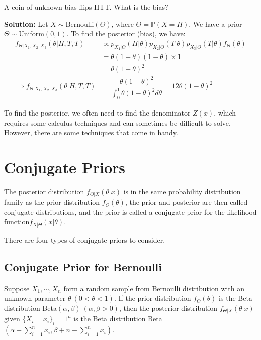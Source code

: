 \newpage
\begin{eg}
  A coin of unknown bias flips HTT. What is the bias?

  \textbf{Solution:} 
  Let \(X \sim \text{Bernoulli}(\Theta)\), where \(\Theta = \mathbb{P}(X = H)\). We have a prior \(\Theta \sim \text{Uniform}(0, 1)\). To find the posterior (bias), we have:
  \[
    \begin{aligned}
      f_{\Theta \vert X_1, X_2, X_3} (\theta \vert H, T, T) &\propto p_{X_1 \vert \Theta} (H \vert \theta) p_{X_2 \vert \Theta} (T \vert \theta) p_{X_3 \vert \Theta} (T \vert \theta) f_{\Theta} (\theta) \\
      &= \theta (1 - \theta) (1 - \theta) \times 1 \\
      &= \theta (1 - \theta)^2 \\
      \Longrightarrow f_{\Theta \vert X_1, X_2, X_3} (\theta \vert H, T, T) &= \dfrac{\theta (1 - \theta)^2}{\int_0 ^1 \theta  (1 - \theta)^2 d \theta} = 12\theta (1 - \theta)^2
    \end{aligned}
  \]
\end{eg}

To find the posterior, we often need to find the denominator \(Z(x)\), which requires some calculus techniques and can sometimes be difficult to solve. However, there are some techniques that come in handy.

\section{Conjugate Priors}

\begin{definition}
  The posterior distribution \(f_{\Theta \vert X} (\theta \vert x)\) is in the same probability distribution family as the prior distribution \(f_{\Theta} (\theta)\), the prior and posterior are then called conjugate distributions, and the prior is called a conjugate prior for
  the likelihood function\(f_{X \vert \Theta} (x \vert \theta)\).
\end{definition}

There are four types of conjugate priors to consider. 

\subsection{Conjugate Prior for Bernoulli}
\begin{definition}
  Suppose \(X_1, \cdots, X_n\) form a random sample from Bernoulli distribution with an unknown parameter \(\theta\ (0 < \theta < 1)\). If the prior distribution \(f_{\Theta}(\theta)\) is the Beta distribution Beta\((\alpha, \beta)\ (\alpha, \beta > 0)\), then the posterior distribution \(f_{\Theta \vert X}(\theta \vert x)\) given \(\{X_i = x_i\}_i=1^n\) is the Beta distribution Beta\((\alpha + \sum_{i = 1}^n x_i, \beta + n - \sum_{i = 1}^n x_i)\). 
\end{definition}

